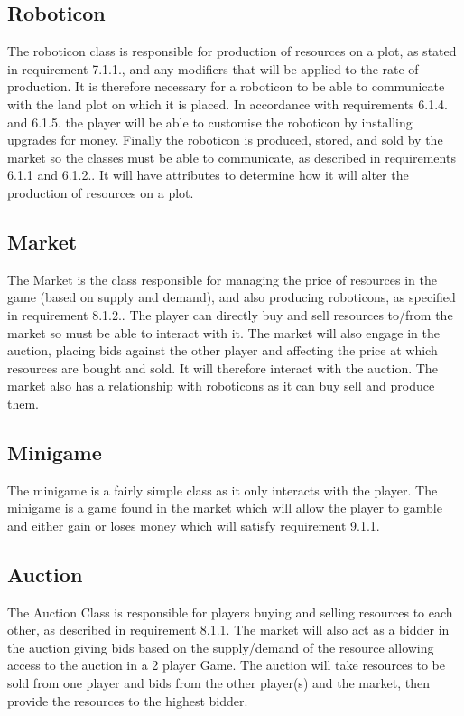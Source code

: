 \subsection{Roboticon}
The roboticon class is responsible for production of resources on a plot, as stated in requirement 7.1.1., and any modifiers that will be applied to the rate of production.
It is therefore necessary for a roboticon to be able to communicate with the land plot on which it is placed.
In accordance with requirements 6.1.4. and 6.1.5. the player will be able to customise the roboticon by installing upgrades for money.
Finally the roboticon is produced, stored, and sold by the market so the classes must be able to communicate, as described in requirements 6.1.1 and 6.1.2..
It will have attributes to determine how it will alter the production of resources on a plot.

\subsection{Market}
The Market is the class responsible for managing the price of resources in the game (based on supply and demand), and also producing roboticons, as specified in requirement 8.1.2..
The player can directly buy and sell resources to/from the market so must be able to interact with it.
The market will also engage in the auction, placing bids against the other player and affecting the price at which resources are bought and sold. It will therefore interact with the auction.
The market also has a relationship with roboticons as it can buy sell and produce them.

\subsection{Minigame}
The minigame is a fairly simple class as it only interacts with the player.
The minigame is a game found in the market which will allow the player to gamble and either gain or loses money which will satisfy requirement 9.1.1.

\subsection{Auction}
The Auction Class is responsible for players buying and selling resources to each other, as described in requirement 8.1.1.
The market will also act as a bidder in the auction giving bids based on the supply/demand of the resource allowing access to the auction in a 2 player Game.
The auction will take resources to be sold from one player and bids from the other player(s) and the market, then provide the resources to the highest bidder.

